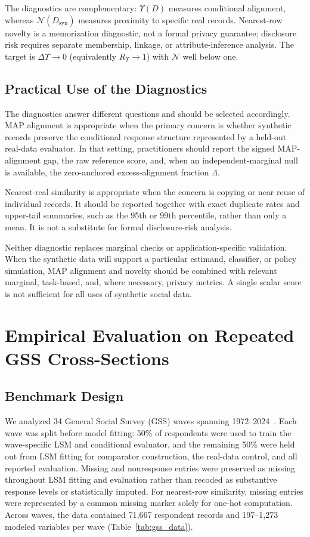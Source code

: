 \documentclass[runningheads]{llncs}
\begin{document}
The diagnostics are complementary: $\Upsilon(D)$ measures conditional
alignment, whereas $\mathcal{N}(D_{\mathrm{syn}})$ measures proximity to
specific real records. Nearest-row novelty is a memorization diagnostic, not a
formal privacy guarantee; disclosure risk requires separate membership, linkage,
or attribute-inference analysis. The target is $\Delta\Upsilon\to0$
(equivalently $R_{\Upsilon}\to1$) with $\mathcal{N}$ well below one.

\subsection{Practical Use of the Diagnostics}

The diagnostics answer different questions and should be selected accordingly.
MAP alignment is appropriate when the primary concern is whether synthetic
records preserve the conditional response structure represented by a held-out
real-data evaluator. In that setting, practitioners should report the signed
MAP-alignment gap, the raw reference score, and, when an independent-marginal
null is available, the zero-anchored excess-alignment fraction $\Lambda$.

Nearest-real similarity is appropriate when the concern is copying or near reuse
of individual records. It should be reported together with exact duplicate rates
and upper-tail summaries, such as the 95th or 99th percentile, rather than only
a mean. It is not a substitute for formal disclosure-risk analysis.

Neither diagnostic replaces marginal checks or application-specific validation.
When the synthetic data will support a particular estimand, classifier, or policy
simulation, MAP alignment and novelty should be combined with relevant marginal,
task-based, and, where necessary, privacy metrics. A single scalar score is not
sufficient for all uses of synthetic social data.


\section{Empirical Evaluation on Repeated GSS Cross-Sections}
\label{sec:gss_results}

\subsection{Benchmark Design}

We analyzed 34 General Social Survey (GSS) waves spanning
1972--2024~\cite{gss2024}. Each wave was split before model fitting: 50\% of
respondents were used to train the wave-specific LSM and conditional evaluator,
and the remaining 50\% were held out from LSM fitting for comparator
construction, the real-data control, and all reported evaluation. Missing and
nonresponse entries were preserved as missing throughout LSM fitting and
evaluation rather than recoded as substantive response levels or statistically
imputed. For nearest-row similarity, missing entries were represented by a
common missing marker solely for one-hot computation. Across waves, the data
contained 71,667 respondent records and 197--1,273 modeled variables per wave
(Table~\ref{tab:gss_data}).
\end{document}
